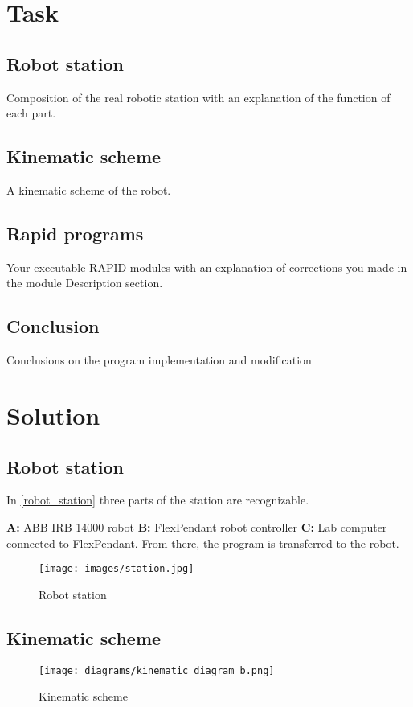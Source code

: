 \chapter{Task}
\section {Robot station}
Composition of the real robotic station with an explanation of the function of each part.
\section {Kinematic scheme}
A kinematic scheme of the robot.

\section {Rapid programs}
Your executable RAPID modules with an explanation of corrections you made in the module Description section.
\section{Conclusion}
Conclusions on the program implementation and modification
\chapter{Solution}
\section {Robot station}

In \autoref{robot_station} three parts of the station are recognizable.
\par
\textbf{A:} ABB IRB 14000 robot\newline
\textbf{B:} FlexPendant robot controller\newline
\textbf{C:} Lab computer connected to FlexPendant. From there, the program is transferred to the robot.
\begin{figure}[H]
    \centering
    \texttt{[image: images/station.jpg]}
    \caption{Robot station}
    \label {robot_station}
\end{figure}


\section {Kinematic scheme}
\begin{figure}[H]
    \centering
    \texttt{[image: diagrams/kinematic\_diagram\_b.png]}
    \caption{Kinematic scheme}
    \label {kinematic_diagram}
\end{figure}


